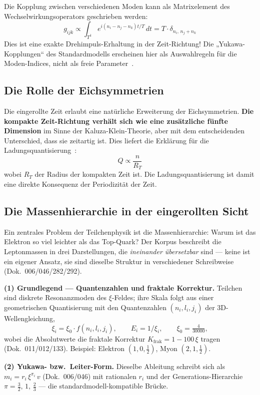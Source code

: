 \documentclass[11pt,a4paper]{article}
\begin{document}
Die Kopplung zwischen verschiedenen Moden kann als Matrixelement des Wechselwirkungsoperators geschrieben werden:
\[
  g_{ijk} \propto \int_{T^1} e^{i(n_i - n_j - n_k)t/T}\, dt = T \cdot \delta_{n_i,\, n_j + n_k}
\]
Dies ist eine exakte Drehimpuls-Erhaltung in der Zeit-Richtung! Die „Yukawa-Kopplungen`` des Standardmodells erscheinen hier als Auswahlregeln für die Moden-Indices, nicht als freie Parameter~\cite{Weinberg1995}.

\subsection{Die Rolle der Eichsymmetrien}

Die eingerollte Zeit erlaubt eine natürliche Erweiterung der Eichsymmetrien. \textbf{Die kompakte Zeit-Richtung verhält sich wie eine zusätzliche fünfte Dimension} im Sinne der Kaluza-Klein-Theorie, aber mit dem entscheidenden Unterschied, dass sie zeitartig ist. Dies liefert die Erklärung für die Ladungsquantisierung~\cite{Kaluza1921,Klein1926}:
\[
  Q \propto \frac{n}{R_T}
\]
wobei $R_T$ der Radius der kompakten Zeit ist. Die Ladungsquantisierung ist damit eine direkte Konsequenz der Periodizität der Zeit.

\subsection{Die Massenhierarchie in der eingerollten Sicht}

Ein zentrales Problem der Teilchenphysik ist die Massenhierarchie: Warum ist das Elektron so viel leichter als das Top-Quark? Der Korpus beschreibt die Leptonmassen in drei Darstellungen, die \emph{ineinander übersetzbar} sind --- keine ist ein eigener Ansatz, sie sind dieselbe Struktur in verschiedener Schreibweise (Dok.~006/046/282/292).

\textbf{(1) Grundlegend --- Quantenzahlen und fraktale Korrektur.} Teilchen sind diskrete Resonanzmoden des $\xi$-Feldes; ihre Skala folgt aus einer geometrischen Quantisierung mit den Quantenzahlen $(n_i,l_i,j_i)$ der 3D-Wellengleichung,
\[
  \xi_i = \xi_0\cdot f(n_i,l_i,j_i),\qquad E_i = 1/\xi_i,\qquad \xi_0=\tfrac{4}{30000},
\]
wobei die Absolutwerte die fraktale Korrektur $K_{\text{frak}}=1-100\,\xi$ tragen (Dok.~011/012/133). Beispiel: Elektron $(1,0,\tfrac12)$, Myon $(2,1,\tfrac12)$.

\textbf{(2) Yukawa- bzw.\ Leiter-Form.} Dieselbe Ableitung schreibt sich als $m_i = r_i\,\xi^{\pi_i}\,v$ (Dok.~006/046) mit rationalen $r_i$ und der Generations-Hierarchie $\pi=\tfrac32,\,1,\,\tfrac23$ --- die stan\-dard\-modell-kompatible Brücke.
\end{document}
